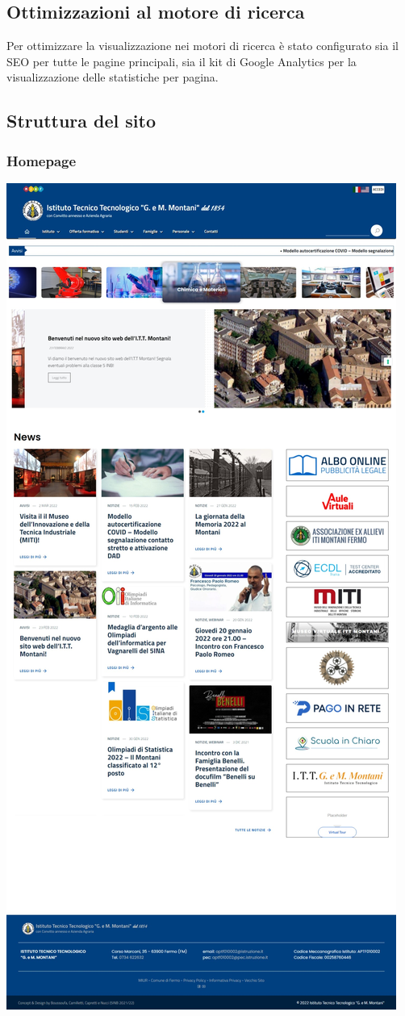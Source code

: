 \documentclass{article}
\begin{document}
	\subsection{\textbf{Ottimizzazioni al motore di ricerca}}
	Per ottimizzare la visualizzazione nei motori di ricerca è stato configurato sia il SEO per tutte le pagine principali, sia il kit di Google Analytics per la visualizzazione delle statistiche per pagina.	
\clearpage

	\subsection{\textbf{Struttura del sito}}
	\subsubsection{\textbf{Homepage}}
	\includegraphics[scale=0.2]{struttura.jpeg}\\
\end{document}
